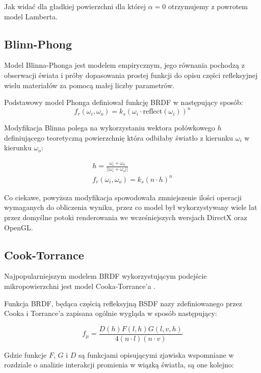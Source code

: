 \documentclass[../main.tex]{subfiles}
\begin{document}
Jak widać dla gładkiej powierzchni dla której $\alpha=0$ otrzymujemy
z powrotem model Lamberta.


\subsection{Blinn-Phong}

Model Blinna-Phonga jest modelem empirycznym, jego równania pochodzą z
obserwacji świata i próby dopasowania prostej funkcji do opisu części
refleksyjnej wielu materiałów za pomocą małej liczby parametrów.

Podstawowy model Phonga definiował funkcję BRDF w następujący sposób:
\[
f_r(\omega_i, \omega_o) =
  k_s \left(
    \omega_i \cdot
    \text{reflect}\left(\omega_i\right)
  \right)^{n}
\]

Modyfikacja Blinna polega na wykorzystaniu wektora połówkowego $h$
definiującego teoretyczną powierzchnię która odbiłaby światło z kierunku
$\omega_i$ w kierunku $\omega_o$:

\begin{gather*}
  h = \frac{\omega_i + \omega_o}{||\omega_i+\omega_o||} \\
  f_r(\omega_i, \omega_o) = k_s (n \cdot h)^{n}
\end{gather*}

Co ciekawe, powyższa modyfikacja spowodowała zmniejszenie ilości operacji
wymaganych do obliczenia wyniku, przez co model był wykorzystywany wiele lat
przez domyślne potoki renderowania we wcześniejszych wersjach DirectX oraz
OpenGL.

\subsection{Cook-Torrance}

Najpopularniejszym modelem BRDF wykorzystującym podejście mikropowierzchni jest
model Cooka-Torrance'a \cite{CookTorrance}.

Funkcja BRDF, będąca częścią refleksyjną BSDF nazy zdefiniowanego przez Cooka i
Torrance'a zapisana ogólnie wygląda w sposób następujący:

\begin{displaymath}
  f_{\mu} = \frac{
    D(h) F(l,h) G(l,v,h)
  }{
    4 (n \cdot l) (n \cdot v)
  }
\end{displaymath}

Gdzie funkcje $F$, $G$ i $D$ są funkcjami opisującymi zjawiska wspomniane
w rozdziale o analizie interakcji promienia w wiązką światła, są one kolejno:
\end{document}
